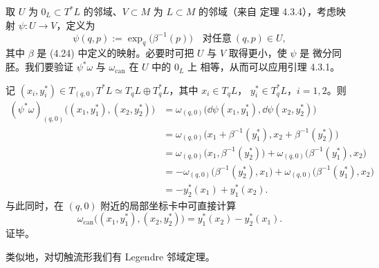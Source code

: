 
\begin{wproof}[定理 4.3.3 的证明]
  取 $U$ 为 $0_L\subset T^*L$ 的邻域、$V\subset M$ 为 $L\subset M$ 的邻域（来自
  定理 4.3.4），考虑映射 $\psi\colon U\to V$，定义为
  \begin{equation*}
    \psi(q,p):=\exp_q\bigl(\beta^{-1}(p)\bigr)
    \quad\text{对任意}\ (q,p)\in U,
  \end{equation*}
  其中 $\beta$ 是 (4.24) 中定义的映射。必要时可把 $U$ 与 $V$ 取得更小，使 $\psi$ 是
  微分同胚。我们要验证 $\psi^*\omega$ 与 $\omega_{\mathrm{can}}$ 在 $U$ 中的 $0_L$ 上
  相等，从而可以应用引理 4.3.1。

  记 $(x_i,y_i^*)\in T_{(q,0)}T^*L\simeq T_qL\oplus T_q^*L$，其中 $x_i\in T_qL$，
  $y_i^*\in T_q^*L$，$i=1,2$。则
  \begin{equation*}
    \begin{aligned}
      (\psi^*\omega)_{(q,0)}\bigl((x_1,y_1^*),(x_2,y_2^*)\bigr)
      &=\omega_{(q,0)}\bigl(\dd\psi(x_1,y_1^*),\dd\psi(x_2,y_2^*)\bigr)\\
      &=\omega_{(q,0)}\bigl(x_1+\beta^{-1}(y_1^*),x_2+\beta^{-1}(y_2^*)\bigr)\\
      &=\omega_{(q,0)}\bigl(x_1,\beta^{-1}(y_2^*)\bigr)
      +\omega_{(q,0)}\bigl(\beta^{-1}(y_1^*),x_2\bigr)\\
      &=-\omega_{(q,0)}\bigl(\beta^{-1}(y_2^*),x_1\bigr)
      +\omega_{(q,0)}\bigl(\beta^{-1}(y_1^*),x_2\bigr)\\
      &=-y_2^*(x_1)+y_1^*(x_2).
    \end{aligned}
  \end{equation*}
  与此同时，在 $(q,0)$ 附近的局部坐标卡中可直接计算
  \begin{equation*}
    \omega_{\mathrm{can}}\bigl((x_1,y_1^*),(x_2,y_2^*)\bigr)
    =y_1^*(x_2)-y_2^*(x_1).
  \end{equation*}
  证毕。
\end{wproof}

类似地，对切触流形我们有 Legendre 邻域定理。

